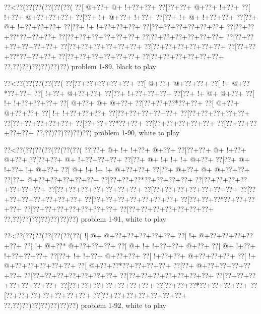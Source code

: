 \vbox{\vbox{\goo
\0??<\0??(\0??(\0??(\0??(\0??(\0??(
\0??[\- @+\0??+\- @+\- !+\0??+\0??+
\0??[\0??+\0??+\- @+\0??+\- !+\0??+
\0??[\- !+\0??+\- @+\0??+\0??+\0??+
\0??[\0??+\- !+\- @+\0??+\- !+\0??+
\0??[\0??+\- !+\- @+\- !+\0??+\0??+
\0??[\0??+\- @+\- !+\0??+\0??+\0??+
\0??[\0??+\- !+\- !+\0??+\0??+\0??+
\0??[\0??+\0??+\0??+\0??+\0??+\0??+
\0??[\0??+\0??+\0??*\0??+\0??+\0??+
\0??[\0??+\0??+\0??+\0??+\0??+\0??+
\0??[\0??+\0??+\0??+\0??+\0??+\0??+
\0??[\0??+\0??+\0??+\0??+\0??+\0??+
\0??[\0??+\0??+\0??+\0??+\0??+\0??+
\0??[\0??+\0??+\0??+\0??+\0??+\0??+
\0??[\0??+\0??+\0??*\0??+\0??+\0??+
\0??[\0??+\0??+\0??+\0??+\0??+\0??+
\0??[\0??+\0??+\0??+\0??+\0??+\0??+
\0??,\0??)\0??)\0??)\0??)\0??)\0??)
}
\hfil problem 1-89, black to play\hfil\break
}

\vbox{\vbox{\goo
\0??<\0??(\0??(\0??(\0??(\0??(
\0??[\0??+\0??+\0??+\0??+\0??+
\0??[\- @+\0??+\- @+\0??+\0??+
\0??[\- !+\- @+\0??*\0??+\0??+
\0??[\- !+\0??+\- @+\0??+\0??+
\0??[\0??+\- !+\0??+\0??+\0??+
\0??[\0??+\- !+\- @+\- @+\0??+
\0??[\- !+\- !+\0??+\0??+\0??+
\0??[\- @+\0??+\- @+\- @+\0??+
\0??[\0??+\0??+\0??*\0??+\0??+
\0??[\- @+\0??+\- @+\0??+\0??+
\0??[\- !+\- !+\0??+\0??+\0??+
\0??[\0??+\0??+\0??+\0??+\0??+
\0??[\0??+\0??+\0??+\0??+\0??+
\0??[\0??+\0??+\0??+\0??+\0??+
\0??[\0??+\0??+\0??*\0??+\0??+
\0??[\0??+\0??+\0??+\0??+\0??+
\0??[\0??+\0??+\0??+\0??+\0??+
\0??,\0??)\0??)\0??)\0??)\0??)
}
\hfil problem 1-90, white to play\hfil\break
}

\vbox{\vbox{\goo
\0??<\0??(\0??(\0??(\0??(\0??(\0??(\0??(
\0??[\0??+\- @+\- !+\- !+\0??+\- @+\0??+
\0??[\0??+\0??+\- @+\- !+\0??+\- @+\0??+
\0??[\0??+\0??+\- @+\- !+\0??+\0??+\0??+
\0??[\0??+\- @+\- !+\- !+\- !+\- @+\0??+
\0??[\0??+\- @+\- !+\0??+\- !+\- @+\0??+
\0??[\- @+\- !+\- !+\- !+\- @+\0??+\0??+
\0??[\0??+\- @+\0??+\- @+\- @+\0??+\0??+
\0??[\0??+\- @+\0??+\0??+\0??+\0??+\0??+
\0??[\0??+\0??+\0??*\0??+\0??+\0??+\0??+
\0??[\0??+\0??+\0??+\0??+\0??+\0??+\0??+
\0??[\0??+\0??+\0??+\0??+\0??+\0??+\0??+
\0??[\0??+\0??+\0??+\0??+\0??+\0??+\0??+
\0??[\0??+\0??+\0??+\0??+\0??+\0??+\0??+
\0??[\0??+\0??+\0??+\0??+\0??+\0??+\0??+
\0??[\0??+\0??+\0??*\0??+\0??+\0??+\0??+
\0??[\0??+\0??+\0??+\0??+\0??+\0??+\0??+
\0??[\0??+\0??+\0??+\0??+\0??+\0??+\0??+
\0??,\0??)\0??)\0??)\0??)\0??)\0??)\0??)
}
\hfil problem 1-91, white to play\hfil\break
}

\vbox{\vbox{\goo
\0??<\0??(\0??(\0??(\0??(\0??(\0??(\0??(
\- ![\- @+\- @+\0??+\0??+\0??+\0??+\0??+
\0??[\- !+\- @+\0??+\0??+\0??+\0??+\0??+
\0??[\- !+\- @+\0??*\- @+\0??+\0??+\0??+
\0??[\- @+\- !+\- !+\0??+\0??+\- @+\0??+
\0??[\- @+\- !+\0??+\- !+\0??+\0??+\0??+
\0??[\0??+\- !+\- !+\0??+\- @+\0??+\0??+
\0??[\- !+\0??+\0??+\- @+\0??+\0??+\0??+
\0??[\- !+\- @+\0??+\0??+\0??+\0??+\0??+
\0??[\- @+\0??+\0??*\0??+\0??+\0??+\0??+
\0??[\0??+\- @+\0??+\0??+\0??+\0??+\0??+
\0??[\0??+\0??+\0??+\0??+\0??+\0??+\0??+
\0??[\0??+\0??+\0??+\0??+\0??+\0??+\0??+
\0??[\0??+\0??+\0??+\0??+\0??+\0??+\0??+
\0??[\0??+\0??+\0??+\0??+\0??+\0??+\0??+
\0??[\0??+\0??+\0??*\0??+\0??+\0??+\0??+
\0??[\0??+\0??+\0??+\0??+\0??+\0??+\0??+
\0??[\0??+\0??+\0??+\0??+\0??+\0??+\0??+
\0??,\0??)\0??)\0??)\0??)\0??)\0??)\0??)
}
\hfil problem 1-92, white to play\hfil\break
}

